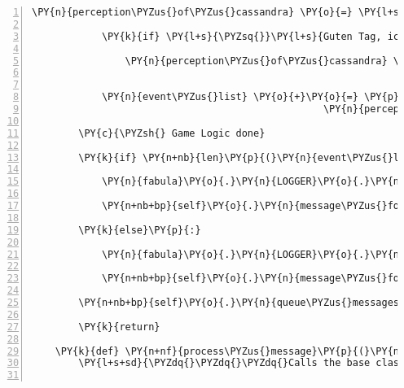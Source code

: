 \begin{Verbatim}[commandchars=\\\{\},numbers=left,firstnumber=1,stepnumber=1]
            \PY{n}{perception\PYZus{}of\PYZus{}cassandra} \PY{o}{=} \PY{l+s}{\PYZsq{}}\PY{l+s}{Die Fee Cassandra}\PY{l+s}{\PYZsq{}}

            \PY{k}{if} \PY{l+s}{\PYZsq{}}\PY{l+s}{Guten Tag, ich bin die Fee Cassandra.}\PY{l+s}{\PYZsq{}} \PY{o+ow}{in} \PY{n+nb+bp}{self}\PY{o}{.}\PY{n}{sentences\PYZus{}cassandra}\PY{p}{:}

                \PY{n}{perception\PYZus{}of\PYZus{}cassandra} \PY{o}{=} \PY{l+s}{\PYZsq{}}\PY{l+s}{Hm, eine Fee...allerdings sieht sie doch ein wenig rundlich aus!}\PY{l+s}{\PYZsq{}}


            \PY{n}{event\PYZus{}list} \PY{o}{+}\PY{o}{=} \PY{p}{[}\PY{n}{fabula}\PY{o}{.}\PY{n}{PerceptionEvent}\PY{p}{(}\PY{n}{identifier}\PY{o}{=}\PY{n}{ID\PYZus{}KUNI}\PY{p}{,}
                                                  \PY{n}{perception}\PY{o}{=}\PY{n}{perception\PYZus{}of\PYZus{}cassandra}\PY{p}{)}\PY{p}{]}

        \PY{c}{\PYZsh{} Game Logic done}

        \PY{k}{if} \PY{n+nb}{len}\PY{p}{(}\PY{n}{event\PYZus{}list}\PY{p}{)}\PY{p}{:}

            \PY{n}{fabula}\PY{o}{.}\PY{n}{LOGGER}\PY{o}{.}\PY{n}{info}\PY{p}{(}\PY{l+s}{\PYZdq{}}\PY{l+s}{returning corresponding events}\PY{l+s}{\PYZdq{}}\PY{p}{)}

            \PY{n+nb+bp}{self}\PY{o}{.}\PY{n}{message\PYZus{}for\PYZus{}host}\PY{o}{.}\PY{n}{event\PYZus{}list} \PY{o}{+}\PY{o}{=} \PY{n}{event\PYZus{}list}

        \PY{k}{else}\PY{p}{:}

            \PY{n}{fabula}\PY{o}{.}\PY{n}{LOGGER}\PY{o}{.}\PY{n}{info}\PY{p}{(}\PY{l+s}{\PYZdq{}}\PY{l+s}{no action defined for event }\PY{l+s}{\PYZsq{}}\PY{l+s}{\PYZob{}\PYZcb{}}\PY{l+s}{\PYZsq{}}\PY{l+s}{, returning AttemptFailedEvent to host}\PY{l+s}{\PYZdq{}}\PY{o}{.}\PY{n}{format}\PY{p}{(}\PY{n}{event}\PY{p}{)}\PY{p}{)}

            \PY{n+nb+bp}{self}\PY{o}{.}\PY{n}{message\PYZus{}for\PYZus{}host}\PY{o}{.}\PY{n}{event\PYZus{}list}\PY{o}{.}\PY{n}{append}\PY{p}{(}\PY{n}{fabula}\PY{o}{.}\PY{n}{AttemptFailedEvent}\PY{p}{(}\PY{n}{event}\PY{o}{.}\PY{n}{identifier}\PY{p}{)}\PY{p}{)}

        \PY{n+nb+bp}{self}\PY{o}{.}\PY{n}{queue\PYZus{}messages}\PY{p}{(}\PY{o}{*}\PY{n}{messages}\PY{p}{)}

        \PY{k}{return}

    \PY{k}{def} \PY{n+nf}{process\PYZus{}message}\PY{p}{(}\PY{n+nb+bp}{self}\PY{p}{,} \PY{n}{message}\PY{p}{)}\PY{p}{:}
        \PY{l+s+sd}{\PYZdq{}\PYZdq{}\PYZdq{}Calls the base class and adds spawning functionality for teleporting tiles to switch rooms.}


\end{Verbatim}
